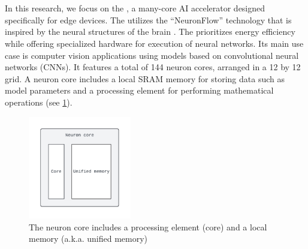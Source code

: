 \section{\graicore{}}
In this research, we focus on the \graicore{}, a many-core AI accelerator designed specifically for edge devices.
The \graicore{} utilizes the ``NeuronFlow'' technology that is inspired by the neural structures of the brain \cite{moreiraNeuronFlowNeuromorphicProcessor2020}.
The \graicore{} prioritizes energy efficiency while offering specialized hardware for execution of neural networks. 
Its main use case is computer vision applications using models based on convolutional neural networks (CNNs).
It features a total of 144 neuron cores, arranged in a 12 by 12 grid.
A neuron core includes a local SRAM memory for storing data such as model parameters and a processing element for performing mathematical operations (see \cref{fig:neuron_core}).

\begin{figure}[htbp]
    \centering
    \includegraphics[width=0.4\textwidth]{assets/neuron_core.pdf}
    \caption{The neuron core includes a processing element (core) and a local memory (a.k.a. unified memory)}
    \label{fig:neuron_core}
\end{figure}

